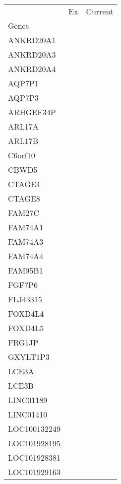 \begin{tabular}{lcc}
\toprule
{} & Ex & Current \\
Genes              &    &         \\
\midrule
ANKRD20A1          &    &         \\
ANKRD20A3          &    &         \\
ANKRD20A4          &    &         \\
AQP7P1             &    &         \\
AQP7P3             &    &         \\
ARHGEF34P          &    &         \\
ARL17A             &    &         \\
ARL17B             &    &         \\
C6orf10            &    &         \\
CBWD5              &    &         \\
CTAGE4             &    &         \\
CTAGE8             &    &         \\
FAM27C             &    &         \\
FAM74A1            &    &         \\
FAM74A3            &    &         \\
FAM74A4            &    &         \\
FAM95B1            &    &         \\
FGF7P6             &    &         \\
FLJ43315           &    &         \\
FOXD4L4            &    &         \\
FOXD4L5            &    &         \\
FRG1JP             &    &         \\
GXYLT1P3           &    &         \\
LCE3A              &    &         \\
LCE3B              &    &         \\
LINC01189          &    &         \\
LINC01410          &    &         \\
LOC100132249       &    &         \\
LOC101928195       &    &         \\
LOC101928381       &    &         \\
LOC101929163       &    &         \\

\end{tabular}
